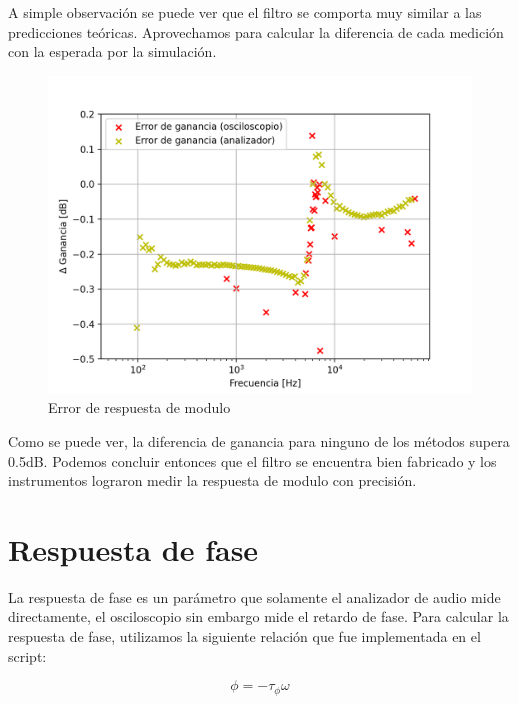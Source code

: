 \documentclass[11pt,a4paper]{report}
\begin{document}
A simple observación se puede ver que el filtro se comporta muy similar a las predicciones teóricas. Aprovechamos para calcular la diferencia de cada medición con la esperada por la simulación.

\begin{figure}[h]
\centering
\includegraphics[scale=0.7]{figs/plots/mag_err.png}
\caption{Error de respuesta de modulo}
\end{figure}

Como se puede ver, la diferencia de ganancia para ninguno de los métodos supera 0.5dB. Podemos concluir entonces que el filtro se encuentra bien fabricado y los instrumentos lograron medir la respuesta de modulo con precisión.

\section{Respuesta de fase}

La respuesta de fase es un parámetro que solamente el analizador de audio mide directamente, el osciloscopio sin embargo mide el retardo de fase. Para calcular la respuesta de fase, utilizamos la siguiente relación que fue implementada en el script:

$$\phi = - \tau_{\phi} \omega$$
\end{document}

